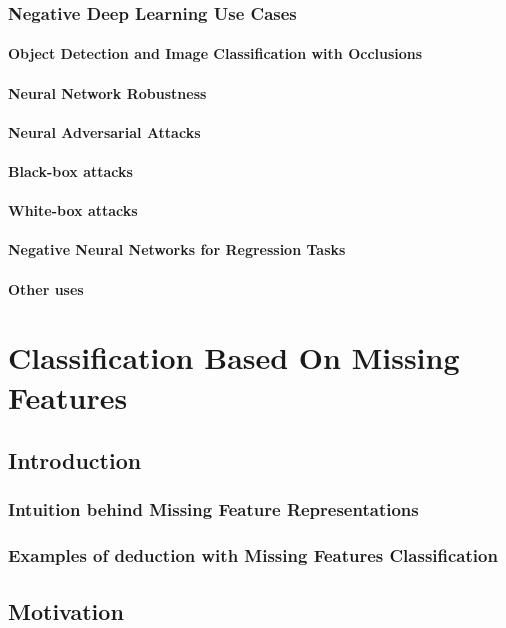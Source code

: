 \documentclass[b5paper]{book}
\begin{document}
\section{Negative Deep Learning Use Cases}
\subsection{Object Detection and Image Classification with Occlusions}
\subsection{Neural Network Robustness}
\subsection{Neural Adversarial Attacks}
\subsection{Black-box attacks}
\subsection{White-box attacks}
\subsection{Negative Neural Networks for Regression Tasks}
\subsection{Other uses}

\part{Classification Based On Missing Features}

\chapter{Introduction}
\section{Intuition behind Missing Feature Representations}
\section{Examples of deduction with Missing Features Classification}

\chapter{Motivation}
\end{document}
